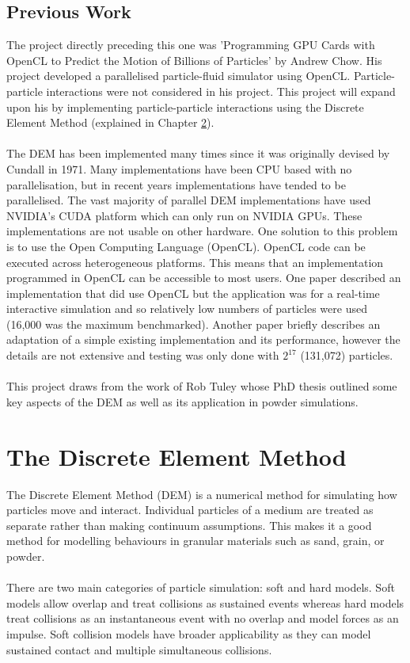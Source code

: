 \documentclass[a4paper,11pt,titlepage]{report}
\begin{document}
\section{Previous Work}
The project directly preceding this one was 'Programming GPU Cards with OpenCL to Predict the Motion of Billions of Particles'\cite{achow} by Andrew Chow. His project developed a parallelised particle-fluid simulator using OpenCL. Particle-particle interactions were not considered in his project. This project will expand upon his by implementing particle-particle interactions using the Discrete Element Method (explained in Chapter \ref{ch:The Discrete Element Method}).
\\\\The DEM has been implemented many times since it was originally devised by Cundall in 1971\cite{cundallphd}. Many implementations have been CPU based with no parallelisation, but in recent years implementations have tended to be parallelised. The vast majority of parallel DEM implementations\cite{blazedem}\cite{GAN20161172}\cite{demcuda1}\cite{demcuda2}\cite{demcuda3} have used NVIDIA's CUDA platform which can only run on NVIDIA GPUs. These implementations are not usable on other hardware. One solution to this problem is to use the Open Computing Language (OpenCL). OpenCL code can be executed across heterogeneous platforms. This means that an implementation programmed in OpenCL can be accessible to most users. One paper described an implementation that did use OpenCL but the application was for a real-time interactive simulation and so relatively low numbers of particles were used (16,000 was the maximum benchmarked)\cite{kinect}. Another paper briefly describes an adaptation of a simple existing implementation and its performance, however the details are not extensive and testing was only done with $2^{17}$ (131,072) particles\cite{washizawa}.
\\\\This project draws from the work of Rob Tuley whose PhD thesis\cite{tuley} outlined some key aspects of the DEM as well as its application in powder simulations.
\chapter{The Discrete Element Method}
\label{ch:The Discrete Element Method}
The Discrete Element Method (DEM) is a numerical method for simulating how particles move and interact. Individual particles of a medium are treated as separate rather than making continuum assumptions. This makes it a good method for modelling behaviours in granular materials such as sand, grain, or powder. 
\\\\There are two main categories of particle simulation: soft and hard models. Soft models allow overlap and treat collisions as sustained events whereas hard models treat collisions as an instantaneous event with no overlap and model forces as an impulse. Soft collision models have broader applicability as they can model sustained contact and multiple simultaneous collisions\cite{softvshard}.
\end{document}
